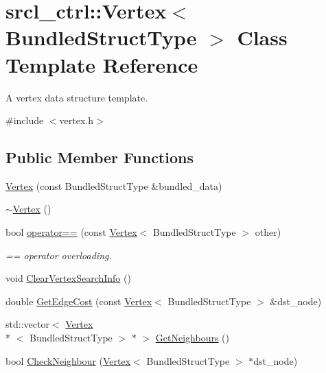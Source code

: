 \hypertarget{classsrcl__ctrl_1_1Vertex}{\section{srcl\-\_\-ctrl\-:\-:Vertex$<$ Bundled\-Struct\-Type $>$ Class Template Reference}
\label{classsrcl__ctrl_1_1Vertex}
}


A vertex data structure template.  




{\ttfamily \#include $<$vertex.\-h$>$}

\subsection*{Public Member Functions}
\begin{DoxyCompactItemize}
\item 
\hyperlink{classsrcl__ctrl_1_1Vertex_abf9a57e6ad113b3f47769e3032ff0174}{Vertex} (const Bundled\-Struct\-Type \&bundled\-\_\-data)
\item 
\hyperlink{classsrcl__ctrl_1_1Vertex_a527b04240dd50adaceee56b4a53e8d21}{$\sim$\-Vertex} ()
\item 
bool \hyperlink{classsrcl__ctrl_1_1Vertex_a57d276209a08fb6caebf8e549e236200}{operator==} (const \hyperlink{classsrcl__ctrl_1_1Vertex}{Vertex}$<$ Bundled\-Struct\-Type $>$ other)
\begin{DoxyCompactList}\small\item\em == operator overloading. \end{DoxyCompactList}\item 
void \hyperlink{classsrcl__ctrl_1_1Vertex_a80f55d28d64d214f6a84bbe4d9e293fc}{Clear\-Vertex\-Search\-Info} ()
\item 
double \hyperlink{classsrcl__ctrl_1_1Vertex_a465a453a589156beeda75723e64de493}{Get\-Edge\-Cost} (const \hyperlink{classsrcl__ctrl_1_1Vertex}{Vertex}$<$ Bundled\-Struct\-Type $>$ \&dst\-\_\-node)
\item 
std\-::vector$<$ \hyperlink{classsrcl__ctrl_1_1Vertex}{Vertex}\\*
$<$ Bundled\-Struct\-Type $>$ $\ast$ $>$ \hyperlink{classsrcl__ctrl_1_1Vertex_acd593fd0c0d90ba2976817b054d7f888}{Get\-Neighbours} ()
\item 
bool \hyperlink{classsrcl__ctrl_1_1Vertex_a87e1900313a784ef2b041a6f29a7e758}{Check\-Neighbour} (\hyperlink{classsrcl__ctrl_1_1Vertex}{Vertex}$<$ Bundled\-Struct\-Type $>$ $\ast$dst\-\_\-node)
\end{DoxyCompactItemize}
